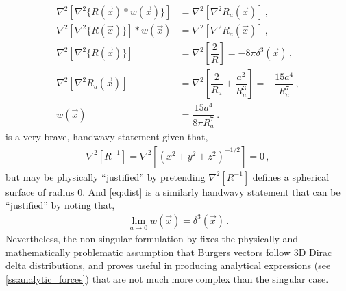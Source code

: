 \begin{subequations}
	\begin{align}
		\nabla^{2}[\nabla^{2} \{R(\vec{x}) * w(\vec{x})\} ] & = \nabla^{2}[\nabla^{2} R_{a}(\vec{x})]\,,                                                             \\
		\nabla^{2}[\nabla^{2} \{R(\vec{x})\}] * w(\vec{x})  & = \nabla^{2}[\nabla^{2} R_{a}(\vec{x})]\,,                                                             \\
		\nabla^{2}[\nabla^{2} \{R(\vec{x})\}]               & = \nabla^{2}\left[\dfrac{2}{R}\right] = -8\pi \delta^{3}(\vec{x}) \label{eq:hand_wavy}\,,              \\
		\nabla^{2}[\nabla^{2} R_{a}(\vec{x})]               & = \nabla^{2}\left[\dfrac{2}{R_{a}} + \dfrac{a^{2}}{R_{a}^{3}}\right] = -\dfrac{15 a^{4}}{R_{a}^{7}}\,, \\
		w(\vec{x})                                          & = \dfrac{15 a^{4}}{8\pi R_{a}^{7}} \label{eq:dist}\,.
	\end{align}
\end{subequations}
 is a very brave, handwavy statement given that,
\begin{align}
	\nabla^{2} \left[R^{-1}\right]= \nabla^{2}\left[(x^{2} + y^{2} + z^{2})^{-1/2}\right] = 0\,,
\end{align}
but may be physically ``justified'' by pretending $ \nabla^{2}\left[R^{-1}\right] $ defines a spherical surface of radius 0. And \cref{eq:dist} is a similarly handwavy statement that can be ``justified'' by noting that,
\begin{align}
	\lim\limits_{a\to 0} w(\vec{x}) = \delta^{3}(\vec{x})\,.
\end{align}
Nevertheless, the non-singular formulation by \citet{a_non-singular_continuum_theory_of_dislocations} fixes the physically and mathematically problematic assumption that Burgers vectors follow 3D Dirac delta distributions, and proves useful in producing analytical expressions (see \cref{ss:analytic_forces}) that are not much more complex than the singular case.

